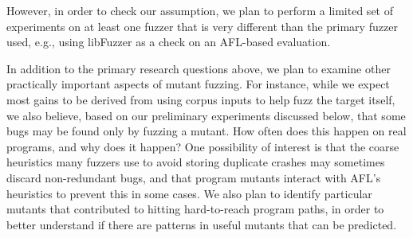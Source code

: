 However, in order to check our assumption, we plan to perform a limited set of experiments on at least one fuzzer that is very different than the primary fuzzer used, e.g., using libFuzzer as a check on an AFL-based evaluation.

In addition to the primary research questions above, we plan to
examine other practically important aspects of mutant fuzzing.  For
instance, while we expect most gains to be derived from using corpus
inputs to help fuzz the target itself, we also believe, based on our
preliminary experiments discussed below, that some bugs may be found
only by fuzzing a mutant.  How often does this happen on real
programs, and why does it happen?  One possibility of interest is that the coarse heuristics many fuzzers use to avoid storing duplicate crashes \cite{semantic-crash-bucketing,mdebug} may sometimes discard non-redundant bugs, and that program mutants interact with AFL's heuristics to prevent this in some cases.  We also plan to identify particular mutants that contributed to hitting hard-to-reach program paths, in order to better understand if there are patterns in useful mutants that can be predicted.
